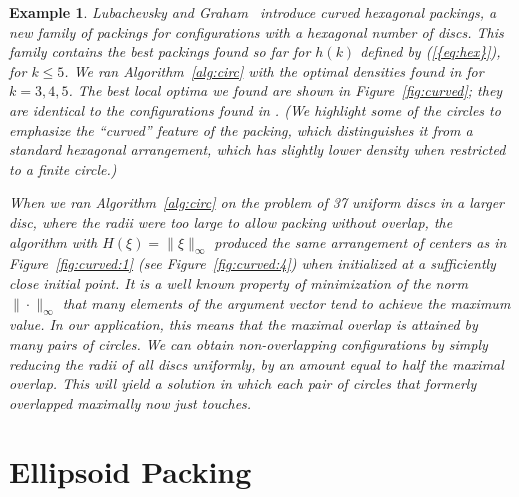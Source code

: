 \documentclass{siamltex}
\newtheorem{Exa}{Example}[section]
\begin{document}
\begin{Exa} \label{ex:curved} Lubachevsky and
  Graham~\cite{LubG04a} introduce \emph{curved hexagonal
    packings}, a new family of packings for configurations with a
  hexagonal number of discs. This family contains the best packings
  found so far for $h(k)$ defined by {(\ref{{eq:hex}})}, for $k \leq
  5$. We ran Algorithm~\ref{alg:circ} with the optimal densities found
  in \cite{LubG04a} for $k=3, 4, 5$. The best local optima we
  found are shown in Figure~\ref{fig:curved}; they are identical to
  the configurations found in \cite{LubG04a}. (We highlight some
  of the circles to emphasize the ``curved'' feature of the packing,
  which distinguishes it from a standard hexagonal arrangement, which
  has slightly lower density when restricted to a finite
  circle.)
  
  
  

  When we ran Algorithm~\ref{alg:circ} on the problem of 37 uniform
  discs in a larger disc, where the radii were too large to allow
  packing without overlap, the algorithm with $H(\xi) = \|
  \xi\|_{\infty}$ produced the same arrangement of centers as in
  Figure~\ref{fig:curved:1} (see Figure~\ref{fig:curved:4}) when
  initialized at a sufficiently close initial point.  It is a well
  known property of minimization of the norm $\| \cdot \|_{\infty}$
  that many elements of the argument vector tend to achieve the
  maximum value. In our application, this means that the maximal
  overlap is attained by many pairs of circles. We can obtain
  non-overlapping configurations by simply reducing the radii of all
  discs uniformly, by an amount equal to half the maximal
  overlap. This will yield a solution in which each pair of circles
  that formerly overlapped maximally now just touches.
\end{Exa}

\section{Ellipsoid Packing} \label{sec:ellipsoid}
\end{document}
